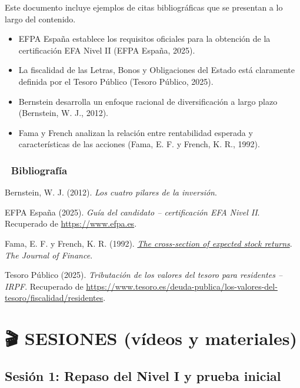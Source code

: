 \documentclass[
  letterpaper,
  DIV=11,
  numbers=noendperiod]{scrreprt}
\newlength{\cslhangindent}
\newenvironment{CSLReferences}[2] %
 {\begin{list}{}{%
  \setlength{\itemindent}{0pt}
  \setlength{\leftmargin}{0pt}
  \setlength{\parsep}{0pt}
  \ifodd #1
   \setlength{\leftmargin}{\cslhangindent}
   \setlength{\itemindent}{-1\cslhangindent}
  \fi
  \setlength{\itemsep}{#2\baselineskip}}}
 {\end{list}}
\begin{document}
Este documento incluye ejemplos de citas bibliográficas que se presentan
a lo largo del contenido.

\begin{itemize}
\item
  EFPA España establece los requisitos oficiales para la obtención de la
  certificación EFA Nivel II (EFPA España, 2025).
\item
  La fiscalidad de las Letras, Bonos y Obligaciones del Estado está
  claramente definida por el Tesoro Público (Tesoro Público, 2025).
\item
  Bernstein desarrolla un enfoque racional de diversificación a largo
  plazo (Bernstein, W. J., 2012).
\item
  Fama y French analizan la relación entre rentabilidad esperada y
  características de las acciones (Fama, E. F. y French, K. R., 1992).
\end{itemize}

\section{📖 Bibliografía}\label{bibliografuxeda}

\label{refs}
\begin{CSLReferences}{1}{0}
Bernstein, W. J. (2012). \emph{Los cuatro pilares de la inversión}.

EFPA España (2025). \emph{Guía del candidato -- certificación EFA Nivel
II}. Recuperado de \url{https://www.efpa.es}.

Fama, E. F. y French, K. R. (1992).
\emph{\href{https://doi.org/10.1111/j.1540-6261.1992.tb04398.x}{The
cross-section of expected stock returns}}. \emph{The Journal of
Finance}.

Tesoro Público (2025). \emph{Tributación de los valores del tesoro para
residentes -- IRPF}. Recuperado de
\url{https://www.tesoro.es/deuda-publica/los-valores-del-tesoro/fiscalidad/residentes}.

\end{CSLReferences}

\part{🎬 SESIONES (vídeos y materiales)}

\chapter{\texorpdfstring{\textbf{Sesión 1: Repaso del Nivel I y prueba
inicial}}{Sesión 1: Repaso del Nivel I y prueba inicial}}\label{sesiuxf3n-1-repaso-del-nivel-i-y-prueba-inicial}
\end{document}

